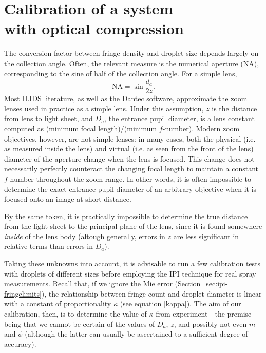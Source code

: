 \documentclass[11.5pt,oneside]{book}
\newcommand*{\secref}[1]{Section~\ref{#1}}
\begin{document}
\section[Calibration of a system with optical compression]{Calibration of a system\\with optical compression}
The conversion factor between fringe density and droplet size depends largely on
the collection angle. Often, the relevant measure is the numerical aperture
(NA), corresponding to the sine of half of the collection angle. For a simple
lens, 
\begin{equation}
    \mathrm{NA} = \sin \frac{d_a}{2z}.
\end{equation}
Most ILIDS literature, as well as the Dantec software, approximate the zoom
lenses used in practice as a simple lens. Under this assumption, $z$ is the
distance from lens to light sheet, and $D_a$, the entrance pupil
diameter, is a lens constant computed as (minimum focal length)/(minimum
$f$-number). Modern zoom objectives, however, are not simple lenses:
in many cases, both the physical (i.e. as measured inside the lens)
and virtual (i.e. as seen from the front of the lens) diameter of
the aperture change when the lens is focused. This change does not
necessarily perfectly counteract the changing focal length to maintain
a constant $f$-number throughout the zoom range. In other words, it is
often impossible to determine the exact entrance pupil diameter of an
arbitrary objective when it is focused onto an image at short distance.

By the same token, it is practically impossible to determine the true distance
from the light sheet to the principal plane of the lens, since it is
found somewhere \emph{inside} of the lens body (altough generally,
errors in $z$ are less significant in relative terms than errors in
$D_a$).

Taking these unknowns into account, it is advisable to run a few
calibration tests with droplets of different sizes before employing the
IPI technique for real spray measurements. Recall that, if we ignore
the Mie error (\secref{sec:ipi-fringelimits}), the relationship between fringe
count and droplet diameter is linear with a constant of proportionality
$\kappa$ (see equation \eqref{kappa}). The aim of our calibration,
then, is to determine the value of $\kappa$ from experiment---the
premise being that we cannot be certain of the values of $D_a$, $z$, and
possibly not even $m$ and $\phi$ (although the latter can usually be
ascertained to a sufficient degree of accuracy).
\end{document}
